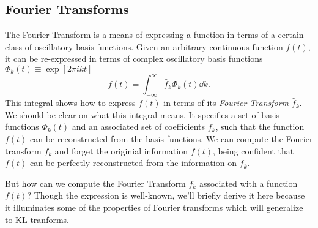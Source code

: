
\subsection{Fourier Transforms}
The Fourier Transform is a means of expressing a function in terms
of a certain class of oscillatory basis functions.
Given an arbitrary continuous function
$f(t)$, it can be re-expressed in terms of complex oscillatory basis functions
$\Phi_k(t) \equiv \exp[2\pi ikt]$
\begin{equation}
  \label{eq:FT_1D}
  f(t) = \int_{-\infty}^\infty \hat{f}_k \Phi_k(t) \dd k.
\end{equation}
This integral shows how to express $f(t)$ in terms of its
{\it Fourier Transform} $\hat{f}_k$. We should be clear on what this
integral means.  
It specifies a set of basis functions $\Phi_k(t)$ and an associated set of
coefficients $f_k$, such that the function $f(t)$ can be reconstructed
from the basis functions.  We can compute
the Fourier transform $f_k$ and forget the originial information $f(t)$,
being confident that $f(t)$ can be perfectly reconstructed from the
information on $f_k$.

But how can we compute the Fourier Transform $f_k$ associated
with a function $f(t)$?  Though
the expression is well-known, we'll briefly derive it here because it
illuminates some of the properties of Fourier transforms which will
generalize to KL tranforms.

